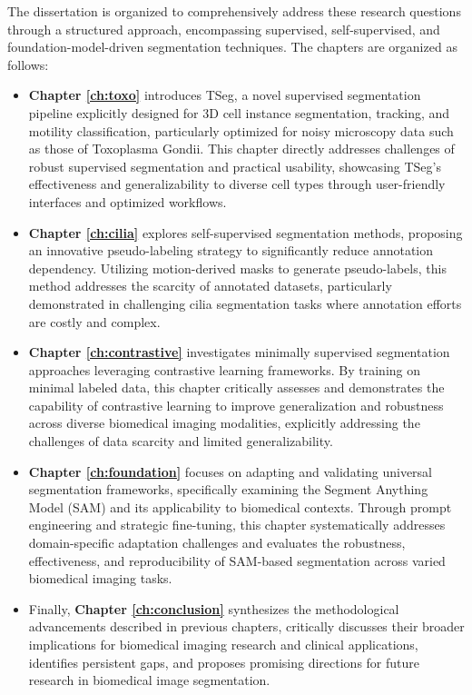 \documentclass[./dissertation.tex]{subfiles}
\begin{document}

The dissertation is organized to comprehensively address these research questions through a structured approach, encompassing supervised, self-supervised, and foundation-model-driven segmentation techniques. The chapters are organized as follows:

\begin{itemize}

    \item \textbf{Chapter \ref{ch:toxo}} introduces TSeg, a novel supervised segmentation pipeline explicitly designed for 3D cell instance segmentation, tracking, and motility classification, particularly optimized for noisy microscopy data such as those of Toxoplasma Gondii. This chapter directly addresses challenges of robust supervised segmentation and practical usability, showcasing TSeg’s effectiveness and generalizability to diverse cell types through user-friendly interfaces and optimized workflows.

    \item \textbf{Chapter \ref{ch:cilia}} explores self-supervised segmentation methods, proposing an innovative pseudo-labeling strategy to significantly reduce annotation dependency. Utilizing motion-derived masks to generate pseudo-labels, this method addresses the scarcity of annotated datasets, particularly demonstrated in challenging cilia segmentation tasks where annotation efforts are costly and complex.

    \item \textbf{Chapter \ref{ch:contrastive}} investigates minimally supervised segmentation approaches leveraging contrastive learning frameworks. By training on minimal labeled data, this chapter critically assesses and demonstrates the capability of contrastive learning to improve generalization and robustness across diverse biomedical imaging modalities, explicitly addressing the challenges of data scarcity and limited generalizability.

    \item \textbf{Chapter \ref{ch:foundation}} focuses on adapting and validating universal segmentation frameworks, specifically examining the Segment Anything Model (SAM) and its applicability to biomedical contexts. Through prompt engineering and strategic fine-tuning, this chapter systematically addresses domain-specific adaptation challenges and evaluates the robustness, effectiveness, and reproducibility of SAM-based segmentation across varied biomedical imaging tasks.

    \item Finally, \textbf{Chapter \ref{ch:conclusion}} synthesizes the methodological advancements described in previous chapters, critically discusses their broader implications for biomedical imaging research and clinical applications, identifies persistent gaps, and proposes promising directions for future research in biomedical image segmentation.

\end{itemize}
\end{document}
